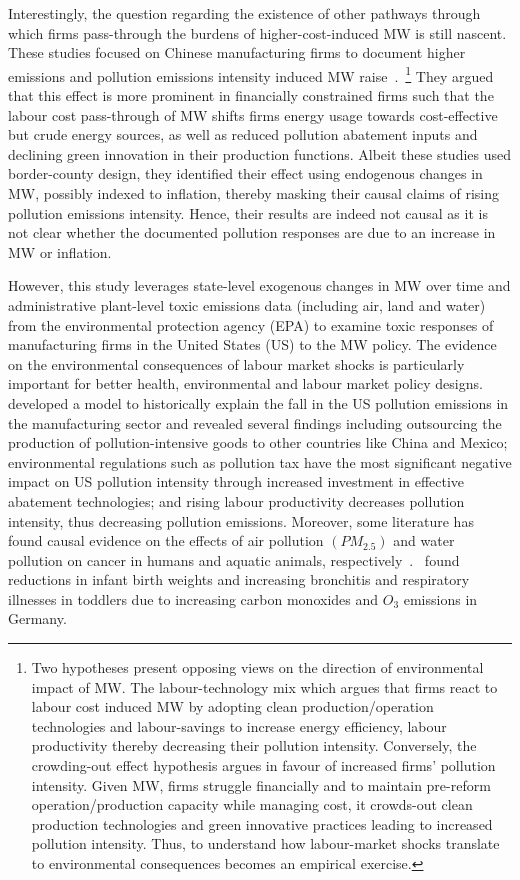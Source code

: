 \documentclass{C:/Users/david/OneDrive/Documents/ULMS/PhD/Thesis/chapter3/src/climate_change/latex/Economic_Journal/OUP-EJ}
\begin{document}
    Interestingly, the question regarding the existence of other pathways through which firms pass-through the burdens of higher-cost-induced MW is still nascent. These studies focused on Chinese manufacturing firms to document higher emissions and pollution emissions intensity induced MW raise~\citep{li2023does, zhang2023unintended}.~\footnote{\tiny Two hypotheses present opposing views on the direction of environmental impact of MW. The labour-technology mix which argues that firms react to labour cost induced MW by adopting clean production/operation technologies and labour-savings to increase energy efficiency, labour productivity thereby decreasing their pollution intensity. Conversely, the crowding-out effect hypothesis argues in favour of increased firms' pollution intensity. Given MW, firms struggle financially and to maintain pre-reform operation/production capacity while managing cost, it crowds-out clean production technologies and green innovative practices leading to increased pollution intensity. Thus, to understand how labour-market shocks translate to environmental consequences becomes an empirical exercise.} They argued that this effect is more prominent in financially constrained firms such that the labour cost pass-through of MW shifts firms energy usage towards cost-effective but crude energy sources, as well as reduced pollution abatement inputs and declining green innovation in their production functions. Albeit these studies used border-county design, they identified their effect using endogenous changes in MW, possibly indexed to inflation, thereby masking their causal claims of rising pollution emissions intensity. Hence, their results are indeed not causal as it is not clear whether the documented pollution responses are due to an increase in MW or inflation.

    However, this study leverages state-level exogenous changes in MW over time and administrative plant-level toxic emissions data (including air, land and water) from the environmental protection agency (EPA) to examine toxic responses of manufacturing firms in the United States (US) to the MW policy. The evidence on the environmental consequences of labour market shocks is particularly important for better health, environmental and labour market policy designs.~\citet{shapiro2018pollution} developed a model to historically explain the fall in the US pollution emissions in the manufacturing sector and revealed several findings including outsourcing the production of pollution-intensive goods to other countries like China and Mexico; environmental regulations such as pollution tax have the most significant negative impact on US pollution intensity through increased investment in effective abatement technologies; and rising labour productivity decreases pollution intensity, thus decreasing pollution emissions. Moreover, some literature has found causal evidence on the effects of air pollution $(PM_{2.5})$ and water pollution on cancer in humans and aquatic animals, respectively~\citep{turner2020outdoor, turner2017ambient, baines2021linking}.~\citet{coneus2012pollution} found reductions in infant birth weights and increasing bronchitis and respiratory illnesses in toddlers due to increasing carbon monoxides and $O_{3}$ emissions in Germany.
\end{document}
